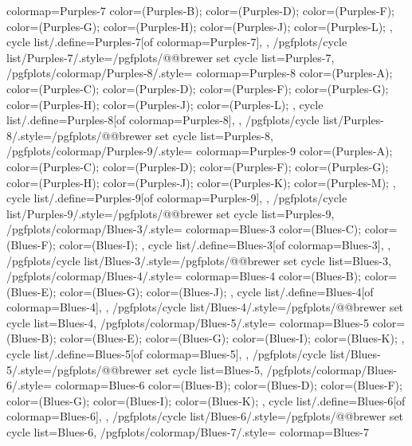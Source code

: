 {{    colormap={Purples-7}{
      color=(Purples-B);
      color=(Purples-D);
      color=(Purples-F);
      color=(Purples-G);
      color=(Purples-H);
      color=(Purples-J);
      color=(Purples-L);
    },
    cycle list/.define={Purples-7}{[of colormap=Purples-7]},
  },
  /pgfplots/cycle list/Purples-7/.style={/pgfplots/@@brewer set cycle list={Purples-7}},
  /pgfplots/colormap/Purples-8/.style={
    colormap={Purples-8}{
      color=(Purples-A);
      color=(Purples-C);
      color=(Purples-D);
      color=(Purples-F);
      color=(Purples-G);
      color=(Purples-H);
      color=(Purples-J);
      color=(Purples-L);
    },
    cycle list/.define={Purples-8}{[of colormap=Purples-8]},
  },
  /pgfplots/cycle list/Purples-8/.style={/pgfplots/@@brewer set cycle list={Purples-8}},
  /pgfplots/colormap/Purples-9/.style={
    colormap={Purples-9}{
      color=(Purples-A);
      color=(Purples-C);
      color=(Purples-D);
      color=(Purples-F);
      color=(Purples-G);
      color=(Purples-H);
      color=(Purples-J);
      color=(Purples-K);
      color=(Purples-M);
    },
    cycle list/.define={Purples-9}{[of colormap=Purples-9]},
  },
  /pgfplots/cycle list/Purples-9/.style={/pgfplots/@@brewer set cycle list={Purples-9}},
  /pgfplots/colormap/Blues-3/.style={
    colormap={Blues-3}{
      color=(Blues-C);
      color=(Blues-F);
      color=(Blues-I);
    },
    cycle list/.define={Blues-3}{[of colormap=Blues-3]},
  },
  /pgfplots/cycle list/Blues-3/.style={/pgfplots/@@brewer set cycle list={Blues-3}},
  /pgfplots/colormap/Blues-4/.style={
    colormap={Blues-4}{
      color=(Blues-B);
      color=(Blues-E);
      color=(Blues-G);
      color=(Blues-J);
    },
    cycle list/.define={Blues-4}{[of colormap=Blues-4]},
  },
  /pgfplots/cycle list/Blues-4/.style={/pgfplots/@@brewer set cycle list={Blues-4}},
  /pgfplots/colormap/Blues-5/.style={
    colormap={Blues-5}{
      color=(Blues-B);
      color=(Blues-E);
      color=(Blues-G);
      color=(Blues-I);
      color=(Blues-K);
    },
    cycle list/.define={Blues-5}{[of colormap=Blues-5]},
  },
  /pgfplots/cycle list/Blues-5/.style={/pgfplots/@@brewer set cycle list={Blues-5}},
  /pgfplots/colormap/Blues-6/.style={
    colormap={Blues-6}{
      color=(Blues-B);
      color=(Blues-D);
      color=(Blues-F);
      color=(Blues-G);
      color=(Blues-I);
      color=(Blues-K);
    },
    cycle list/.define={Blues-6}{[of colormap=Blues-6]},
  },
  /pgfplots/cycle list/Blues-6/.style={/pgfplots/@@brewer set cycle list={Blues-6}},
  /pgfplots/colormap/Blues-7/.style={
    colormap={Blues-7}{
}}}
